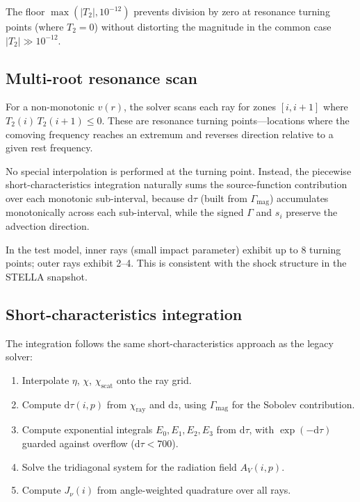 \documentclass[11pt,a4paper]{article}
\begin{document}
The floor $\max(|T_2|, 10^{-12})$ prevents division by zero at resonance
turning points (where $T_2 = 0$) without distorting the magnitude in the
common case $|T_2| \gg 10^{-12}$.

\subsection{Multi-root resonance scan}

For a non-monotonic $v(r)$, the solver scans each ray for zones
$[i, i{+}1]$ where $T_2(i)\,T_2(i{+}1) \leq 0$.  These are resonance
turning points---locations where the comoving frequency reaches an
extremum and reverses direction relative to a given rest frequency.

No special interpolation is performed at the turning point.  Instead,
the piecewise short-characteristics integration naturally sums the
source-function contribution over each monotonic sub-interval, because
$\mathrm{d}\tau$ (built from $\Gamma_{\mathrm{mag}}$) accumulates
monotonically across each sub-interval, while the signed $\Gamma$ and
$s_i$ preserve the advection direction.

In the test model, inner rays (small impact parameter) exhibit up to 8
turning points; outer rays exhibit 2--4.  This is consistent with the
shock structure in the STELLA snapshot.

\subsection{Short-characteristics integration}

The integration follows the same short-characteristics approach as the
legacy solver:
\begin{enumerate}[noitemsep]
  \item Interpolate $\eta$, $\chi$, $\chi_{\mathrm{scat}}$ onto the ray grid.
  \item Compute $\mathrm{d}\tau(i,p)$ from $\chi_{\mathrm{ray}}$ and
        $\mathrm{d}z$, using $\Gamma_{\mathrm{mag}}$ for the Sobolev
        contribution.
  \item Compute exponential integrals $E_0, E_1, E_2, E_3$ from
        $\mathrm{d}\tau$, with $\exp(-\mathrm{d}\tau)$ guarded against
        overflow ($\mathrm{d}\tau < 700$).
  \item Solve the tridiagonal system for the radiation field
        $A_V(i,p)$.
  \item Compute $J_\nu(i)$ from angle-weighted quadrature over all rays.
\end{enumerate}
\end{document}
